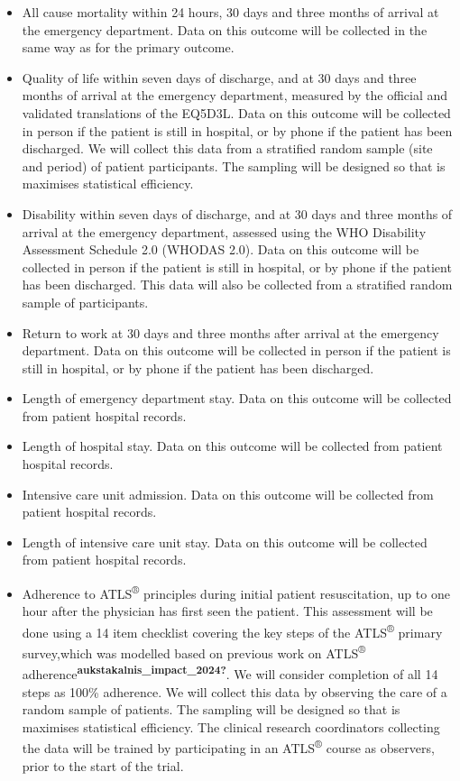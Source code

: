 \documentclass[
]{scrartcl}
\providecommand{\tightlist}{%
  \setlength{\itemsep}{0pt}\setlength{\parskip}{0pt}}\usepackage{longtable,booktabs,array}
\begin{document}
\begin{itemize}
\tightlist
\item
  All cause mortality within 24 hours, 30 days and three months of
  arrival at the emergency department. Data on this outcome will be
  collected in the same way as for the primary outcome.
\item
  Quality of life within seven days of discharge, and at 30 days and
  three months of arrival at the emergency department, measured by the
  official and validated translations of the EQ5D3L. Data on this
  outcome will be collected in person if the patient is still in
  hospital, or by phone if the patient has been discharged. We will
  collect this data from a stratified random sample (site and period) of
  patient participants. The sampling will be designed so that is
  maximises statistical efficiency.
\item
  Disability within seven days of discharge, and at 30 days and three
  months of arrival at the emergency department, assessed using the WHO
  Disability Assessment Schedule 2.0 (WHODAS 2.0). Data on this outcome
  will be collected in person if the patient is still in hospital, or by
  phone if the patient has been discharged. This data will also be
  collected from a stratified random sample of participants.
\item
  Return to work at 30 days and three months after arrival at the
  emergency department. Data on this outcome will be collected in person
  if the patient is still in hospital, or by phone if the patient has
  been discharged.
\item
  Length of emergency department stay. Data on this outcome will be
  collected from patient hospital records.
\item
  Length of hospital stay. Data on this outcome will be collected from
  patient hospital records.
\item
  Intensive care unit admission. Data on this outcome will be collected
  from patient hospital records.
\item
  Length of intensive care unit stay. Data on this outcome will be
  collected from patient hospital records.
\item
  Adherence to ATLS\textsuperscript{®} principles during initial patient
  resuscitation, up to one hour after the physician has first seen the
  patient. This assessment will be done using a 14 item checklist
  covering the key steps of the ATLS\textsuperscript{®} primary
  survey,which was modelled based on previous work on
  ATLS\textsuperscript{®}
  adherence\textsuperscript{\textbf{aukstakalnis\_impact\_2024?}}. We
  will consider completion of all 14 steps as 100\% adherence. We will
  collect this data by observing the care of a random sample of
  patients. The sampling will be designed so that is maximises
  statistical efficiency. The clinical research coordinators collecting
  the data will be trained by participating in an
  ATLS\textsuperscript{®} course as observers, prior to the start of the
  trial.
\end{itemize}
\end{document}
